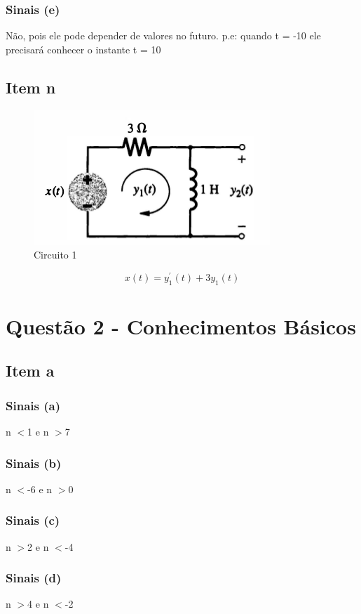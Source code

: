 \documentclass[a4paper, 12pt]{article}
\begin{document}
            \subsubsection{Sinais (e)}
            N\~ao, pois ele pode depender de valores no futuro. p.e: quando t = -10 ele precisar\'a conhecer o instante t = 10
        \subsection{Item n}
            \begin{figure}[!ht]
                \centering
                \includegraphics{img/Figura5.PNG}
                \caption{Circuito 1}
            \end{figure}
            \[x(t) = y_{1}^{'}(t) + 3y_{1}(t)\]
        \newpage
    \section{Quest\~{a}o 2 - Conhecimentos Básicos}
        \subsection{Item a}
            \subsubsection{Sinais (a)}
            n $<$1 e n $>$7
            \subsubsection{Sinais (b)}
            n $<$-6 e n $>$0
            \subsubsection{Sinais (c)}
            n $>$2 e n $<$-4
            \subsubsection{Sinais (d)}
            n $>$4 e n $<$-2
\end{document}
